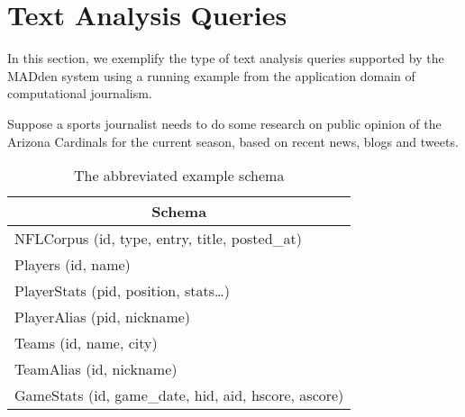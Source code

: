 
\section{Text Analysis Queries}

In this section, we exemplify the type of text analysis queries
supported by the MADden system using a running example from the
application domain of computational journalism.

Suppose a sports journalist needs to do some research on public opinion of the
Arizona Cardinals for the current season, based on recent news, blogs and
tweets.




\begin{table}
\begin{center}
\begin{tabular}{|l|}
\hline
\multicolumn{1}{|c|}{Schema}\\
\hline
NFLCorpus (id, type, entry, title, posted\_at)\\
\hline
Players (id, name)\\
\hline
PlayerStats (pid, position, stats\ldots)\\
\hline
PlayerAlias (pid, nickname)\\
\hline
Teams (id, name, city)\\
\hline
TeamAlias (id, nickname)\\
\hline
GameStats (id, game\_date, hid, aid, hscore, ascore)\\
\hline
\end{tabular}
\end{center}
\caption{The abbreviated example schema}
\label{tab:schema}
\end{table}

